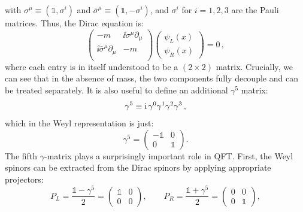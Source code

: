 \documentclass[main.tex]{subfiles}
\begin{document}
with $\sigma^\mu \equiv (\mathds{1}, \sigma^i)$ and $\bar{\sigma}^\mu \equiv (\mathds{1}, -\sigma^i)$, and $\sigma^i$ for $i=1,2,3$ are the Pauli matrices. Thus, the Dirac equation is:
\begin{equation}
    \begin{pmatrix}
        -m & \ii \sigma^\mu \partial_\mu \\
        \ii \bar{\sigma}^\mu \partial_\mu & -m \\
    \end{pmatrix}
    \begin{pmatrix}
        \psi_L(x) \\
        \psi_R(x)
    \end{pmatrix} = 0 \,,
\end{equation}
where each entry is in itself understood to be a $(2 \times 2)$ matrix. Crucially, we can see that in the absence of mass, the two components fully decouple and can be treated separately. It is also useful to define an additional $\gamma^5$ matrix: 
\begin{equation}
    \gamma^5 \equiv \mathrm{i}\, \gamma^0 \gamma^1 \gamma^2 \gamma^3\,,
\end{equation}
which in the Weyl representation is just:
\begin{equation}
    \gamma^5 = 
    \begin{pmatrix}
        -\mathds{1} & 0 \\
        0 & \mathds{1}
    \end{pmatrix}.
\end{equation}
The fifth $\gamma$-matrix plays a surprisingly important role in QFT. First, the Weyl spinors can be extracted from the Dirac spinors by applying appropriate projectors:
\begin{equation}
    P_L = \frac{\mathds{1}-\gamma^5}{2} = 
    \begin{pmatrix}
        \mathds{1} & 0 \\
        0 & 0
    \end{pmatrix},
    \qquad
    P_R = \frac{\mathds{1}+\gamma^5}{2} = 
    \begin{pmatrix}
        0 & 0 \\
        0 & \mathds{1}
    \end{pmatrix},
\end{equation}
\end{document}

